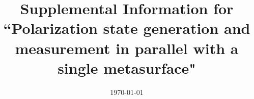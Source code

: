 \documentclass[footinbib,aps,prl,superscriptaddress]{revtex4-1}
\begin{document}

\title{Supplemental Information for ``Polarization state generation and measurement in parallel with a single metasurface"}





\date{\today}


\maketitle

\end{document}
